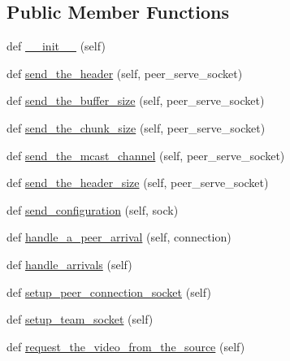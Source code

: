 \subsection*{Public Member Functions}
\begin{DoxyCompactItemize}
\item 
def \hyperlink{classsrc_1_1core_1_1splitter__ims_1_1Splitter__IMS_a08e883da468a496050643ed4d3ebe7ec}{\+\_\+\+\_\+init\+\_\+\+\_\+} (self)
\item 
def \hyperlink{classsrc_1_1core_1_1splitter__ims_1_1Splitter__IMS_ab51c45d5be26aa2822185b80320439ca}{send\+\_\+the\+\_\+header} (self, peer\+\_\+serve\+\_\+socket)
\item 
def \hyperlink{classsrc_1_1core_1_1splitter__ims_1_1Splitter__IMS_a2bbdaf55fc7e81e17e8efec91f38788a}{send\+\_\+the\+\_\+buffer\+\_\+size} (self, peer\+\_\+serve\+\_\+socket)
\item 
def \hyperlink{classsrc_1_1core_1_1splitter__ims_1_1Splitter__IMS_a415c0fc4cfe0f025d718be042c5948db}{send\+\_\+the\+\_\+chunk\+\_\+size} (self, peer\+\_\+serve\+\_\+socket)
\item 
def \hyperlink{classsrc_1_1core_1_1splitter__ims_1_1Splitter__IMS_aca4bf65e2da064279b64083d1cb1e404}{send\+\_\+the\+\_\+mcast\+\_\+channel} (self, peer\+\_\+serve\+\_\+socket)
\item 
def \hyperlink{classsrc_1_1core_1_1splitter__ims_1_1Splitter__IMS_a24cfd557424444b9516c11d02938c999}{send\+\_\+the\+\_\+header\+\_\+size} (self, peer\+\_\+serve\+\_\+socket)
\item 
def \hyperlink{classsrc_1_1core_1_1splitter__ims_1_1Splitter__IMS_a8a762b50573ee073ab440d18ff57138c}{send\+\_\+configuration} (self, sock)
\item 
def \hyperlink{classsrc_1_1core_1_1splitter__ims_1_1Splitter__IMS_aff34457cbf46162558aab3a518d7d447}{handle\+\_\+a\+\_\+peer\+\_\+arrival} (self, connection)
\item 
def \hyperlink{classsrc_1_1core_1_1splitter__ims_1_1Splitter__IMS_a64447c571263f0745e61e303c6063d4a}{handle\+\_\+arrivals} (self)
\item 
def \hyperlink{classsrc_1_1core_1_1splitter__ims_1_1Splitter__IMS_a2e49df1eaeb13d3adb01336beed12788}{setup\+\_\+peer\+\_\+connection\+\_\+socket} (self)
\item 
def \hyperlink{classsrc_1_1core_1_1splitter__ims_1_1Splitter__IMS_addc5189d3724bd37c0801a6fc7507c51}{setup\+\_\+team\+\_\+socket} (self)
\item 
def \hyperlink{classsrc_1_1core_1_1splitter__ims_1_1Splitter__IMS_a09234cfb736513eac15319737fc9b141}{request\+\_\+the\+\_\+video\+\_\+from\+\_\+the\+\_\+source} (self)

\end{DoxyCompactItemize}
